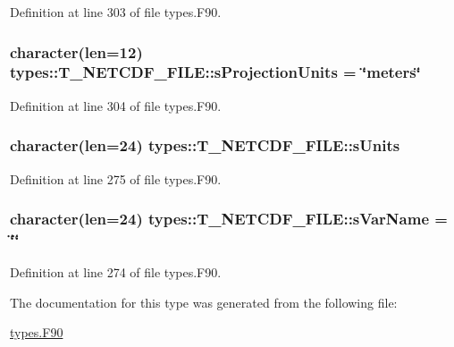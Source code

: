 Definition at line 303 of file types.F90.

\hypertarget{typetypes_1_1_t___n_e_t_c_d_f___f_i_l_e_a493da74bc251dd8a957ab31f0c2cfdc9}{
\subsubsection[{sProjectionUnits}]{\setlength{\rightskip}{0pt plus 5cm}character(len=12) {\bf types::T\_\-NETCDF\_\-FILE::sProjectionUnits} = \char`\"{}meters\char`\"{}}}
\label{typetypes_1_1_t___n_e_t_c_d_f___f_i_l_e_a493da74bc251dd8a957ab31f0c2cfdc9}


Definition at line 304 of file types.F90.

\hypertarget{typetypes_1_1_t___n_e_t_c_d_f___f_i_l_e_ad4643d4c210ab6236d562ba8c546fe44}{
\subsubsection[{sUnits}]{\setlength{\rightskip}{0pt plus 5cm}character(len=24) {\bf types::T\_\-NETCDF\_\-FILE::sUnits}}}
\label{typetypes_1_1_t___n_e_t_c_d_f___f_i_l_e_ad4643d4c210ab6236d562ba8c546fe44}


Definition at line 275 of file types.F90.

\hypertarget{typetypes_1_1_t___n_e_t_c_d_f___f_i_l_e_acc53643bf044d504efff2c49b7bf1d8f}{
\subsubsection[{sVarName}]{\setlength{\rightskip}{0pt plus 5cm}character(len=24) {\bf types::T\_\-NETCDF\_\-FILE::sVarName} = \char`\"{}\char`\"{}}}
\label{typetypes_1_1_t___n_e_t_c_d_f___f_i_l_e_acc53643bf044d504efff2c49b7bf1d8f}


Definition at line 274 of file types.F90.



The documentation for this type was generated from the following file:\begin{DoxyCompactItemize}
\item 
\hyperlink{types_8_f90}{types.F90}\end{DoxyCompactItemize}
